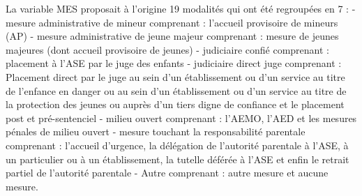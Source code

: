 \documentclass[
  12,
  a4paper,
]{report}
\begin{document}
\begin{mdframed}[frametitle=Le recodage de la variable du type de mesures (MES)]

La variable MES proposait à l’origine 19 modalités qui ont été regroupées en 7 : 
-   mesure administrative de mineur comprenant : l’accueil provisoire de mineurs (AP)
-   mesure administrative de jeune majeur comprenant : mesure de jeunes majeures (dont accueil provisoire de jeunes)
-   judiciaire confié comprenant : placement à l’ASE par le juge des enfants
-   judiciaire direct juge comprenant : Placement direct par le juge au sein d'un établissement ou d'un service au titre de l’enfance en danger ou au sein d'un établissement ou d'un service au titre de la protection des jeunes ou auprès d'un tiers digne de confiance et le placement post et pré-sentenciel
-   milieu ouvert comprenant : l’AEMO, l’AED et les mesures pénales de milieu ouvert
-   mesure touchant la responsabilité parentale comprenant : l’accueil d’urgence, la délégation de l’autorité parentale à l’ASE, à un particulier ou à un établissement, la tutelle déférée à l’ASE et enfin le retrait partiel de l’autorité parentale 
-   Autre comprenant : autre mesure et aucune mesure.

\end{mdframed}
\end{document}
